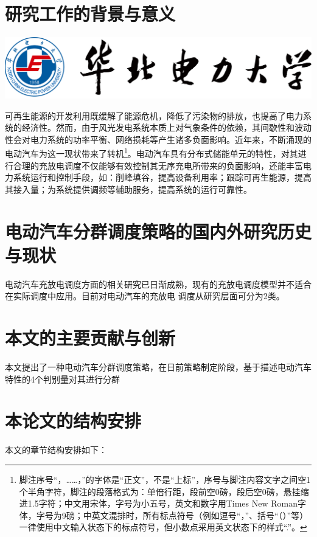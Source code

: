 \documentclass[bachelor]{NCEPU-thesis}
\begin{document}
\section{研究工作的背景与意义}
\includegraphics[height=2.6 cm]{Thesis_Materials/Univ_ICON.png}

可再生能源的开发利用既缓解了能源危机，降低了污染物的排放，也提高了电力系统的经济性。然而，由于风光发电系统本质上对气象条件的依赖，其间歇性和波动性会对电力系统的功率平衡、网络损耗等产生诸多负面影响。近年来，不断涌现的电动汽车为这一现状带来了转机\footnote{脚注序号“，……，”的字体是“正文”，不是“上标”，序号与脚注内容文字之间空1个半角字符，脚注的段落格式为：单倍行距，段前空0磅，段后空0磅，悬挂缩进1.5字符；中文用宋体，字号为小五号，英文和数字用Times New Roman字体，字号为9磅；中英文混排时，所有标点符号（例如逗号“，”、括号“（）”等）一律使用中文输入状态下的标点符号，但小数点采用英文状态下的样式“.”。}。电动汽车具有分布式储能单元的特性，对其进行合理的充放电调度不仅能够有效控制其无序充电所带来的负面影响，还能丰富电力系统运行和控制手段，如：削峰填谷，提高设备利用率；跟踪可再生能源，提高其接入量；为系统提供调频等辅助服务，提高系统的运行可靠性。

\section{电动汽车分群调度策略的国内外研究历史与现状}
电动汽车充放电调度方面的相关研究已日渐成熟，现有的充放电调度模型并不适合在实际调度中应用。目前对电动汽车的充放电
调度从研究层面可分为2类。

\section{本文的主要贡献与创新}
本文提出了一种电动汽车分群调度策略，在日前策略制定阶段，基于描述电动汽车特性的4个判别量对其进行分群

\section{本论文的结构安排}
本文的章节结构安排如下：
\end{document}
